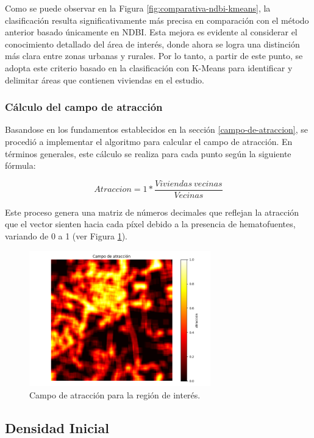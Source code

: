 Como se puede observar en la Figura \ref{fig:comparativa-ndbi-kmeans}, la clasificación resulta significativamente más precisa en comparación con el método anterior basado únicamente en NDBI. Esta mejora es evidente al considerar el conocimiento detallado del área de interés, donde ahora se logra una distinción más clara entre zonas urbanas y rurales. Por lo tanto, a partir de este punto, se adopta este criterio basado en la clasificación con K-Means para identificar y delimitar áreas que contienen viviendas en el estudio.

\subsubsection{Cálculo del campo de atracción}

Basandose en los fundamentos establecidos en la sección \ref{campo-de-atraccion}, se procedió a implementar el algoritmo para calcular el campo de atracción. En términos generales, este cálculo se realiza para cada punto según la siguiente fórmula:

$$Atraccion = 1 * \frac{Viviendas~vecinas}{Vecinas}$$

Este proceso genera una matriz de números decimales que reflejan la atracción que el vector sienten hacia cada píxel debido a la presencia de hematofuentes, variando de 0 a 1 (ver Figura \ref{fig:atraccion}).

\begin{figure}[H]
	\includegraphics[width=0.7\textwidth]{campoDeAtraccion.png}
	\centering
	\caption{Campo de atracción para la región de interés.}
	\label{fig:atraccion}
\end{figure}

\subsection{Densidad Inicial}

